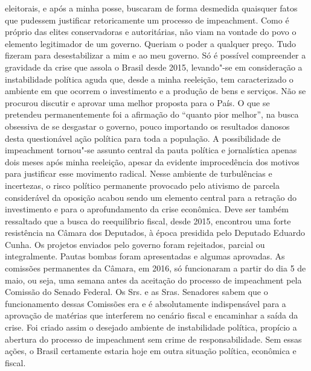eleitorais, e após a minha posse, buscaram de forma desmedida quaisquer
fatos que pudessem justificar retoricamente um processo de impeachment.
Como é próprio das elites conservadoras e autoritárias, não viam na
vontade do povo o elemento legitimador de um governo. Queriam o poder a
qualquer preço. Tudo fizeram para desestabilizar a mim e ao meu governo.
Só é possível compreender a gravidade da crise que assola o Brasil desde
2015, levando"-se em consideração a instabilidade política aguda que,
desde a minha reeleição, tem caracterizado o ambiente em que ocorrem o
investimento e a produção de bens e serviços. Não se procurou discutir e
aprovar uma melhor proposta para o País. O que se pretendeu
permanentemente foi a afirmação do ``quanto pior melhor'', na busca
obsessiva de se desgastar o governo, pouco importando os resultados
danosos desta questionável ação política para toda a população. A
possibilidade de impeachment tornou"-se assunto central da pauta política
e jornalística apenas dois meses após minha reeleição, apesar da
evidente improcedência dos motivos para justificar esse movimento
radical. Nesse ambiente de turbulências e incertezas, o risco político
permanente provocado pelo ativismo de parcela considerável da oposição
acabou sendo um elemento central para a retração do investimento e para
o aprofundamento da crise econômica. Deve ser também ressaltado que a
busca do reequilíbrio fiscal, desde 2015, encontrou uma forte
resistência na Câmara dos Deputados, à época presidida pelo Deputado
Eduardo Cunha. Os projetos enviados pelo governo foram rejeitados,
parcial ou integralmente. Pautas bombas foram apresentadas e algumas
aprovadas. As comissões permanentes da Câmara, em 2016, só funcionaram a
partir do dia 5 de maio, ou seja, uma semana antes da aceitação do
processo de impeachment pela Comissão do Senado Federal. Os Srs. e as
Sras. Senadores sabem que o funcionamento dessas Comissões era e é
absolutamente indispensável para a aprovação de matérias que interferem
no cenário fiscal e encaminhar a saída da crise. Foi criado assim o
desejado ambiente de instabilidade política, propício a abertura do
processo de impeachment sem crime de responsabilidade. Sem essas ações,
o Brasil certamente estaria hoje em outra situação política, econômica e
fiscal.

